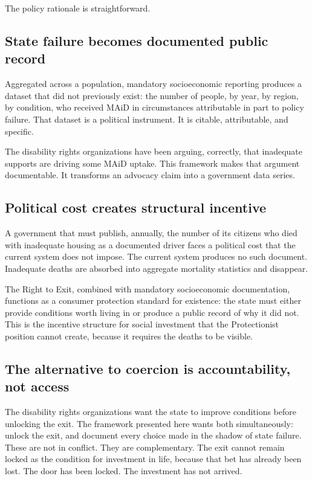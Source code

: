 \documentclass[11pt, letterpaper]{article}
\begin{document}
The policy rationale is straightforward.

\subsection{State failure becomes documented public record}

Aggregated across a population, mandatory socioeconomic reporting produces a dataset that
did not previously exist: the number of people, by year, by region, by condition, who
received MAiD in circumstances attributable in part to policy failure. That dataset is
a political instrument. It is citable, attributable, and specific.

The disability rights organizations have been arguing, correctly, that inadequate supports
are driving some MAiD uptake. This framework makes that argument documentable. It transforms
an advocacy claim into a government data series.

\subsection{Political cost creates structural incentive}

A government that must publish, annually, the number of its citizens who died with inadequate
housing as a documented driver faces a political cost that the current system does not
impose. The current system produces no such document. Inadequate deaths are absorbed into
aggregate mortality statistics and disappear.

The Right to Exit, combined with mandatory socioeconomic documentation, functions as a
consumer protection standard for existence: the state must either provide conditions worth
living in or produce a public record of why it did not. This is the incentive structure
for social investment that the Protectionist position cannot create, because it requires
the deaths to be visible.

\subsection{The alternative to coercion is accountability, not access}

The disability rights organizations want the state to improve conditions before unlocking
the exit. The framework presented here wants both simultaneously: unlock the exit, and
document every choice made in the shadow of state failure. These are not in conflict.
They are complementary. The exit cannot remain locked as the condition for investment
in life, because that bet has already been lost. The door has been locked. The investment
has not arrived.
\end{document}
